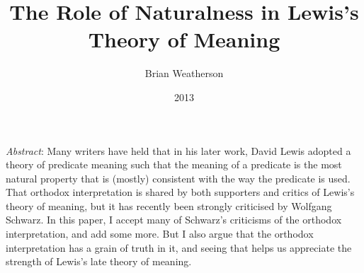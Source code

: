 \documentclass[
  11pt,
  letterpaper,
  DIV=11,
  numbers=noendperiod,
  twoside]{scrartcl}
\title{The Role of Naturalness in Lewis's Theory of Meaning}
\author{Brian Weatherson}
\date{2013}
\renewenvironment{abstract}
 {\vspace{-1.25cm}
 \quotation\small\noindent\emph{Abstract}:}
 {\endquotation}
\renewenvironment{abstract}
 {\quotation\small\noindent\emph{Abstract}:}
 {\endquotation\vspace{-0.02cm}}
\begin{document}
\maketitle
\begin{abstract}
Many writers have held that in his later work, David Lewis adopted a
theory of predicate meaning such that the meaning of a predicate is the
most natural property that is (mostly) consistent with the way the
predicate is used. That orthodox interpretation is shared by both
supporters and critics of Lewis's theory of meaning, but it has recently
been strongly criticised by Wolfgang Schwarz. In this paper, I accept
many of Schwarz's criticisms of the orthodox interpretation, and add
some more. But I also argue that the orthodox interpretation has a grain
of truth in it, and seeing that helps us appreciate the strength of
Lewis's late theory of meaning.
\end{abstract}
\end{document}
